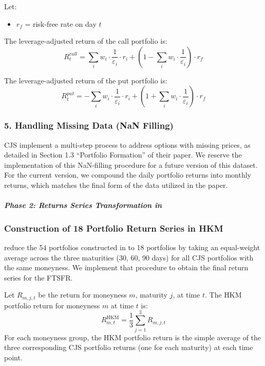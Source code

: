 \documentclass{article}
\begin{document}
\begin{appendices}
Let:
\begin{itemize}
  \item $r_{f}$ = risk-free rate on day $t$
\end{itemize}

The leverage-adjusted return of the call portfolio is:
\[
R_t^{call} = \sum_{i} w_{i} \cdot \frac{1}{\varepsilon_{i}} \cdot r_{i} + \left(1 - \sum_{i} w_{i} \cdot \frac{1}{\varepsilon_{i}} \right) \cdot r_f
\]

The leverage-adjusted return of the put portfolio is:
\[
R_t^{put} = -\sum_{i} w_{i} \cdot \frac{1}{\varepsilon_{i}} \cdot r_{i} + \left(1 + \sum_{i} w_{i} \cdot \frac{1}{\varepsilon_{i}} \right) \cdot r_f
\]



\subsubsection*{5. Handling Missing Data (NaN Filling)}

CJS implement a multi-step process to address options with missing prices, as detailed in Section 1.3 ``Portfolio Formation'' of their paper. We reserve the implementation of this NaN-filling procedure for a future version of this dataset. For the current version, we compound the daily portfolio returns into monthly returns, which matches the final form of the data utilized in the paper.


\paragraph{\textit{Phase 2: Returns Series Transformation in \citet{He2017}}}
\subsubsection*{Construction of 18 Portfolio Return Series in HKM}

\citet{He2017} reduce the 54 portfolios constructed in \citet{Constantinides2013} to 18 portfolios by taking an equal-weight average across the three maturities (30, 60, 90 days) for all CJS portfolios with the same moneyness. We implement that procedure to obtain the final return series for the FTSFR.

Let \( R_{m,j,t} \) be the return for moneyness \( m \), maturity \( j \), at time \( t \).
The HKM portfolio return for moneyness \( m \) at time \( t \) is:
\[
R_{m,t}^{\mathrm{HKM}} = \frac{1}{3} \sum_{j=1}^{3} R_{m,j,t}
\]
For each moneyness group, the HKM portfolio return is the simple average of the three corresponding CJS portfolio returns (one for each maturity) at each time point.


\end{appendices}
\end{document}
